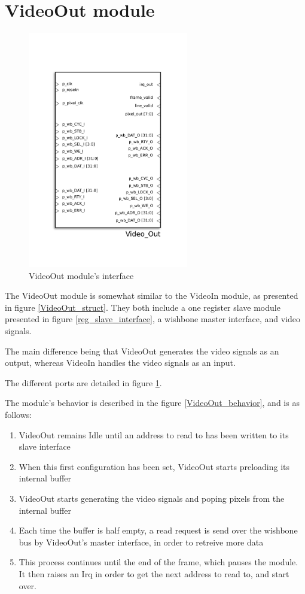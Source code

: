 
\section{VideoOut module}

\begin{figure}[H]
\center
\includegraphics[width=7cm]{figs/Video_out.pdf}
\caption{VideoOut module's interface}
\label{VideoOut_interface}
\end{figure}

The VideoOut module is somewhat similar to the VideoIn module, as presented in figure \ref{VideoOut_struct}. They both include a one register slave module presented in figure \ref{reg_slave_interface}, a wishbone master interface, and video signals.


The main difference being that VideoOut generates the video signals as an output, whereas VideoIn handles the video signals as an input.

The different ports are detailed in figure \ref{VideoOut_interface}.

The module's behavior is described in the figure \ref{VideoOut_behavior}, and is as follows:
\begin{enumerate}
\item VideoOut remains Idle until an address to read to has been written to its slave interface
\item When this first configuration has been set, VideoOut starts preloading its internal buffer
\item VideoOut starts generating the video signals and poping pixels from the internal buffer
\item Each time the buffer is half empty, a read request is send over the wishbone bus by VideoOut's master interface, in order to retreive more data
\item This process continues until the end of the frame, which pauses the module. It then raises an Irq in order to get the next address to read to, and start over.
\end{enumerate}


